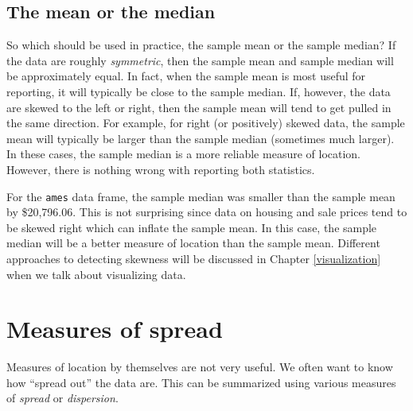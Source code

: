 \documentclass[]{book}
\theoremstyle{definition}
\theoremstyle{definition}
\theoremstyle{definition}
\theoremstyle{remark}
\begin{document}
\hypertarget{the-mean-or-the-median}{%
\subsection{The mean or the median}\label{the-mean-or-the-median}}

So which should be used in practice, the sample mean or the sample
median? If the data are roughly \emph{symmetric}, then the sample mean
and sample median will be approximately equal. In fact, when the sample
mean is most useful for reporting, it will typically be close to the
sample median. If, however, the data are skewed to the left or right,
then the sample mean will tend to get pulled in the same direction. For
example, for right (or positively) skewed data, the sample mean will
typically be larger than the sample median (sometimes much larger). In
these cases, the sample median is a more reliable measure of location.
However, there is nothing wrong with reporting both statistics.

For the \texttt{ames} data frame, the sample median was smaller than the
sample mean by \$20,796.06. This is not surprising since data on housing
and sale prices tend to be skewed right which can inflate the sample
mean. In this case, the sample median will be a better measure of
location than the sample mean. Different approaches to detecting
skewness will be discussed in Chapter \ref{visualization} when we talk
about visualizing data.

\hypertarget{measures-of-spread}{%
\section{Measures of spread}\label{measures-of-spread}}

Measures of location by themselves are not very useful. We often want to
know how ``spread out'' the data are. This can be summarized using
various measures of \emph{spread} or \emph{dispersion}.
\end{document}
